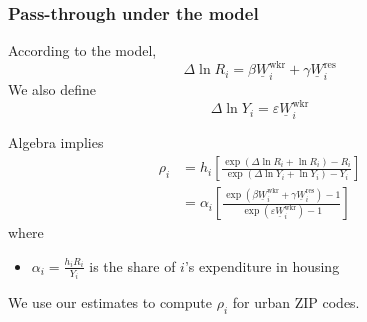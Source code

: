 \documentclass[aspectratio=169, t]{beamer}
\newcommand{\MW}{\underline{W}}
\begin{document}
\begin{frame}
    \frametitle{Pass-through under the model}

    According to the model,
    $$
    \Delta \ln R_i = \beta \MW_i^{\text{wkr}} + \gamma \MW_i^{\text{res}}
    $$
    We also define
    $$
    \Delta \ln Y_i = \varepsilon \MW_i^{\text{wkr}}
    $$

    \pause
    \vspace{2mm}
    Algebra implies
    \begin{equation*}
        \begin{split}
            \rho_i & = h_i \left[ 
                \frac{\exp \left(\Delta \ln R_i + \ln R_i \right) - R_i }{\exp \left( \Delta \ln Y_i + \ln Y_i \right) - Y_i }
                \right] \\
                & = \alpha_i \left[
                    \frac{\exp \left( \beta \MW_i^{\text{wkr}} + \gamma \MW_i^{\text{res}} \right) - 1 }{\exp \left( \varepsilon \MW_i^{\text{wkr}} \right) - 1 }
                \right]
        \end{split}
    \end{equation*}
    where
    \begin{itemize}
        \item $\alpha_i = \frac{h_i R_i}{Y_i}$ is the share of $i$'s expenditure in housing
    \end{itemize}

    \vspace{2mm}
    We use our estimates to compute $\rho_i$ for urban ZIP codes.
\end{frame}
\end{document}
